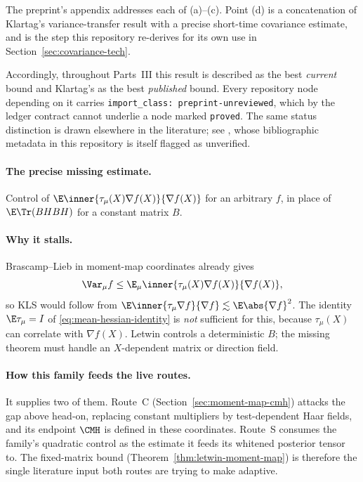 \documentclass[../../main.tex]{subfiles}
\begin{document}
The preprint's appendix addresses each of (a)--(c). Point (d) is a concatenation of Klartag's
variance-transfer result with a precise short-time covariance estimate, and is the step this
repository re-derives for its own use in Section~\ref{sec:covariance-tech}.

Accordingly, throughout Parts~III this result is described as the best \emph{current} bound and
Klartag's as the best \emph{published} bound. Every repository node depending on it carries
\texttt{import\_class: preprint-unreviewed}, which by the ledger contract cannot underlie a node
marked \texttt{proved}. The same status distinction is drawn elsewhere in the literature; see
\cite{Zhang2026HitAndRun}, whose bibliographic metadata in this repository is itself flagged as
unverified.

\paragraph{The precise missing estimate.}
Control of $\E\inner{\tau_\mu(X)\nabla f(X)}{\nabla f(X)}$ for an arbitrary $f$, in place of
$\E\Tr(BHBH)$ for a constant matrix $B$.

\paragraph{Why it stalls.}
Brascamp--Lieb in moment-map coordinates already gives
\begin{equation}
  \Var_\mu f\le\E_\mu\inner{\tau_\mu(X)\nabla f(X)}{\nabla f(X)},
  \label{eq:mm-brascamp-lieb}
\end{equation}
so KLS would follow from $\E\inner{\tau_\mu\nabla f}{\nabla f}\lesssim\E\abs{\nabla f}^2$. The
identity $\E\tau_\mu=I$ of \eqref{eq:mean-hessian-identity} is \emph{not} sufficient for this,
because $\tau_\mu(X)$ can correlate with $\nabla f(X)$. Letwin controls a deterministic $B$; the
missing theorem must handle an $X$-dependent matrix or direction field.

\paragraph{How this family feeds the live routes.}
It supplies two of them. Route~C (Section~\ref{sec:moment-map-cmh}) attacks the gap above
head-on, replacing constant multipliers by test-dependent Haar fields, and its endpoint
$\CMH$ is defined in these coordinates. Route~S consumes the family's quadratic control as the
estimate it feeds its whitened posterior tensor to. The fixed-matrix bound
(Theorem~\ref{thm:letwin-moment-map}) is therefore the single literature input both routes are
trying to make adaptive.
\end{document}

